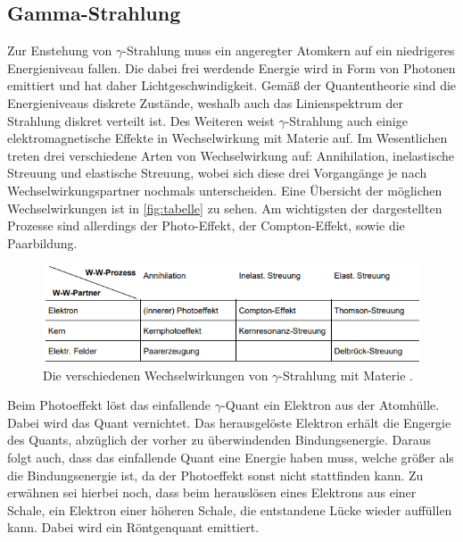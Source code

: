 \subsection{Gamma-Strahlung}
Zur Enstehung von $\gamma$-Strahlung muss ein angeregter Atomkern auf ein niedrigeres Energieniveau fallen. Die dabei frei werdende 
Energie wird in Form von Photonen emittiert und hat daher Lichtgeschwindigkeit. Gemäß der Quantentheorie sind die Energieniveaus diskrete
Zustände, weshalb auch das Linienspektrum der Strahlung diskret verteilt ist. Des Weiteren weist $\gamma$-Strahlung auch einige elektromagnetische 
Effekte in Wechselwirkung mit Materie auf. Im Wesentlichen treten drei verschiedene Arten von Wechselwirkung auf: Annihilation, inelastische 
Streuung und elastische Streuung, wobei sich diese drei Vorgangänge je nach Wechselwirkungspartner nochmals unterscheiden. Eine Übersicht der
möglichen Wechselwirkungen ist in \autoref{fig:tabelle} zu sehen. Am wichtigsten der dargestellten Prozesse sind allerdings der Photo-Effekt,
der Compton-Effekt, sowie die Paarbildung. 
\begin{figure}
        \centering
        \includegraphics[width=\textwidth]{content/tabelle.png}
        \caption{Die verschiedenen Wechselwirkungen von $\gamma$-Strahlung mit Materie \cite[233]{V704}.}
        \label{fig:tabelle}
    \end{figure}

Beim Photoeffekt löst das einfallende $\gamma$-Quant ein Elektron aus der Atomhülle. Dabei wird das Quant vernichtet. Das herausgelöste
Elektron erhält die Engergie des Quants, abzüglich der vorher zu überwindenden Bindungsenergie. Daraus folgt auch, dass das einfallende 
Quant eine Energie haben muss, welche größer als die Bindungsenergie ist, da der Photoeffekt sonst nicht stattfinden kann.
Zu erwähnen sei hierbei noch, dass beim herauslösen eines Elektrons aus einer Schale, ein Elektron einer höheren Schale, die entstandene 
Lücke wieder auffüllen kann. Dabei wird ein Röntgenquant emittiert.

